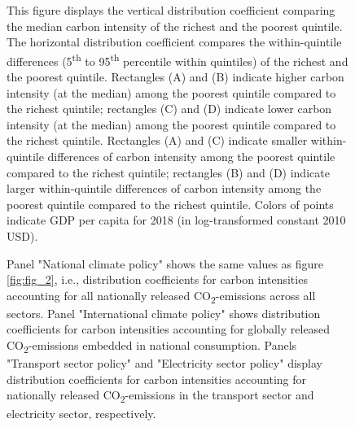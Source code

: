 \documentclass[12pt, a4paper]{article}
\newenvironment{subcaption2}
{\strut
\vspace{-5pt}
\begin{minipage}[b]{0.95\textwidth}
  \hspace*{-\parindent}
  \footnotesize}
 {\end{minipage}}
\begin{document}
\begin{refsection}
\begin{figure}[ht!]
\begin{subcaption2}
    This figure displays the vertical distribution coefficient comparing the median carbon intensity of the richest and the poorest quintile. The horizontal distribution coefficient compares the within-quintile differences (5\textsuperscript{th} to 95\textsuperscript{th} percentile within quintiles) of the richest and the poorest quintile. Rectangles (A) and (B) indicate higher carbon intensity (at the median) among the poorest quintile compared to the richest quintile; rectangles (C) and (D) indicate lower carbon intensity (at the median) among the poorest quintile compared to the richest quintile. Rectangles (A) and (C) indicate smaller within-quintile differences of carbon intensity among the poorest quintile compared to the richest quintile; rectangles (B) and (D) indicate larger within-quintile differences of carbon intensity among the poorest quintile compared to the richest quintile. Colors of points indicate GDP per capita for 2018 (in log-transformed constant 2010 USD).
    
    Panel "National climate policy" shows the same values as figure \ref{fig:fig_2}, i.e., distribution coefficients for carbon intensities accounting for all nationally released CO\textsubscript{2}-emissions across all sectors. Panel "International climate policy" shows distribution coefficients for carbon intensities accounting for globally released CO\textsubscript{2}-emissions embedded in national consumption. Panels "Transport sector policy" and "Electricity sector policy" display distribution coefficients for carbon intensities accounting for nationally released CO\textsubscript{2}-emissions in the transport sector and electricity sector, respectively.
    \end{subcaption2}
\end{figure}
\clearpage


\end{refsection}
\end{document}
